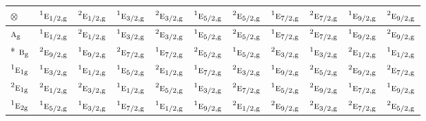 \documentclass[10pt,a4paper]{article}
\numberwithin{equation}{section}
\newcommand{\irr}[1]{\text{\normalfont\scshape #1}}
\newcommand{\conjpair}[1]{{}^{#1}}
\newcommand{\ptag}[1]{\mathrm{#1}}
\newcommand{\irrprod}{\otimes}
\begin{document}
{\small\setlength{\tabcolsep}{3pt}\begin{longtable}{@{}lcccccccccc@{}}\toprule
$\irrprod$ & $\conjpair{1}\irr{e}_{1/2,\ptag{g}}$ & $\conjpair{2}\irr{e}_{1/2,\ptag{g}}$ & $\conjpair{1}\irr{e}_{3/2,\ptag{g}}$ & $\conjpair{2}\irr{e}_{3/2,\ptag{g}}$ & $\conjpair{1}\irr{e}_{5/2,\ptag{g}}$ & $\conjpair{2}\irr{e}_{5/2,\ptag{g}}$ & $\conjpair{1}\irr{e}_{7/2,\ptag{g}}$ & $\conjpair{2}\irr{e}_{7/2,\ptag{g}}$ & $\conjpair{1}\irr{e}_{9/2,\ptag{g}}$ & $\conjpair{2}\irr{e}_{9/2,\ptag{g}}$\\\midrule\endhead
\bottomrule\endfoot\endlastfoot
$\irr{a}_{\ptag{g}}$ & $\conjpair{1}\irr{e}_{1/2,\ptag{g}}$ & $\conjpair{2}\irr{e}_{1/2,\ptag{g}}$ & $\conjpair{1}\irr{e}_{3/2,\ptag{g}}$ & $\conjpair{2}\irr{e}_{3/2,\ptag{g}}$ & $\conjpair{1}\irr{e}_{5/2,\ptag{g}}$ & $\conjpair{2}\irr{e}_{5/2,\ptag{g}}$ & $\conjpair{1}\irr{e}_{7/2,\ptag{g}}$ & $\conjpair{2}\irr{e}_{7/2,\ptag{g}}$ & $\conjpair{1}\irr{e}_{9/2,\ptag{g}}$ & $\conjpair{2}\irr{e}_{9/2,\ptag{g}}$\\*
$\irr{b}_{\ptag{g}}$ & $\conjpair{2}\irr{e}_{9/2,\ptag{g}}$ & $\conjpair{1}\irr{e}_{9/2,\ptag{g}}$ & $\conjpair{2}\irr{e}_{7/2,\ptag{g}}$ & $\conjpair{1}\irr{e}_{7/2,\ptag{g}}$ & $\conjpair{2}\irr{e}_{5/2,\ptag{g}}$ & $\conjpair{1}\irr{e}_{5/2,\ptag{g}}$ & $\conjpair{2}\irr{e}_{3/2,\ptag{g}}$ & $\conjpair{1}\irr{e}_{3/2,\ptag{g}}$ & $\conjpair{2}\irr{e}_{1/2,\ptag{g}}$ & $\conjpair{1}\irr{e}_{1/2,\ptag{g}}$\\
$\conjpair{1}\irr{e}_{1\ptag{g}}$ & $\conjpair{1}\irr{e}_{3/2,\ptag{g}}$ & $\conjpair{1}\irr{e}_{1/2,\ptag{g}}$ & $\conjpair{1}\irr{e}_{5/2,\ptag{g}}$ & $\conjpair{2}\irr{e}_{1/2,\ptag{g}}$ & $\conjpair{1}\irr{e}_{7/2,\ptag{g}}$ & $\conjpair{2}\irr{e}_{3/2,\ptag{g}}$ & $\conjpair{1}\irr{e}_{9/2,\ptag{g}}$ & $\conjpair{2}\irr{e}_{5/2,\ptag{g}}$ & $\conjpair{2}\irr{e}_{9/2,\ptag{g}}$ & $\conjpair{2}\irr{e}_{7/2,\ptag{g}}$\\
$\conjpair{2}\irr{e}_{1\ptag{g}}$ & $\conjpair{2}\irr{e}_{1/2,\ptag{g}}$ & $\conjpair{2}\irr{e}_{3/2,\ptag{g}}$ & $\conjpair{1}\irr{e}_{1/2,\ptag{g}}$ & $\conjpair{2}\irr{e}_{5/2,\ptag{g}}$ & $\conjpair{1}\irr{e}_{3/2,\ptag{g}}$ & $\conjpair{2}\irr{e}_{7/2,\ptag{g}}$ & $\conjpair{1}\irr{e}_{5/2,\ptag{g}}$ & $\conjpair{2}\irr{e}_{9/2,\ptag{g}}$ & $\conjpair{1}\irr{e}_{7/2,\ptag{g}}$ & $\conjpair{1}\irr{e}_{9/2,\ptag{g}}$\\
$\conjpair{1}\irr{e}_{2\ptag{g}}$ & $\conjpair{1}\irr{e}_{5/2,\ptag{g}}$ & $\conjpair{1}\irr{e}_{3/2,\ptag{g}}$ & $\conjpair{1}\irr{e}_{7/2,\ptag{g}}$ & $\conjpair{1}\irr{e}_{1/2,\ptag{g}}$ & $\conjpair{1}\irr{e}_{9/2,\ptag{g}}$ & $\conjpair{2}\irr{e}_{1/2,\ptag{g}}$ & $\conjpair{2}\irr{e}_{9/2,\ptag{g}}$ & $\conjpair{2}\irr{e}_{3/2,\ptag{g}}$ & $\conjpair{2}\irr{e}_{7/2,\ptag{g}}$ & $\conjpair{2}\irr{e}_{5/2,\ptag{g}}$\\

\end{longtable}}
\end{document}
